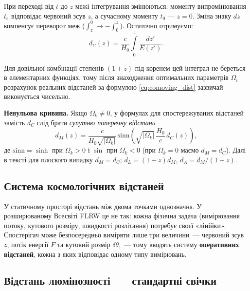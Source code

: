 При переході від $t$ до $z$ межі інтегрування змінюються: моменту
випромінювання $t_e$ відповідає червоний зсув $z$, а сучасному
моменту $t_0$ --- $z=0$. Зміна знаку $dz$ компенсує переворот меж
($\int_z^0 \to -\int_0^z$). Остаточно отримуємо:
\begin{equation}\label{eq:comoving_dist}
d_C(z) = \frac{c}{H_0}\int\limits_0^z \frac{dz'}{E(z')}.
\end{equation}

Для довільної комбінації степенів $(1+z)$ під коренем цей інтеграл
не береться в елементарних функціях, тому після знаходження оптимальних
параметрів $\Omega_i$ розрахунок реальних відстаней за формулою
\eqref{eq:comoving_dist} зазвичай виконується чисельно.

\medskip\noindent
\textbf{Ненульова кривина.} Якщо $\Omega_k \neq 0$, у формулах для спостережуваних відстаней
замість $d_C$ слід брати \emph{супутню поперечну відстань}
\[
  d_M(z) = \frac{c}{H_0\sqrt{|\Omega_k|}}\,
  \mathrm{sinn}\!\left(\sqrt{|\Omega_k|}\,\frac{H_0}{c}\,d_C(z)\right),
\]
де $\mathrm{sinn}=\sinh$ при $\Omega_k>0$ і $\sin$ при $\Omega_k<0$ (при $\Omega_k=0$ маємо $d_M=d_C$).
Далі в тексті для плоского випадку $d_M=d_C$; $d_L=(1+z)d_M$, $d_A=d_M/(1+z)$.

\subsection*{Система космологічних відстаней}

У статичному просторі відстань між двома точками однозначна.
У розширюваному Всесвіті FLRW це не так: кожна фізична задача
(вимірювання потоку, кутового розміру, швидкості розлітання)
потребує своєї «лінійки». Спостерігач може безпосередньо виміряти
лише три величини~--- червоний зсув $z$, потік енергії $F$ та
кутовий розмір $\delta\theta$,~--- тому вводять систему
\textbf{оперативних відстаней}, кожна з яких відповідає одному
типу вимірювань.

\subsection*{Відстань люмінозності~--- стандартні свічки}

